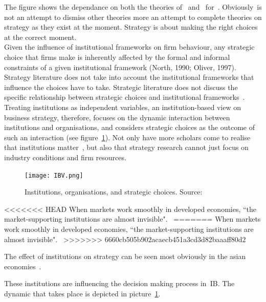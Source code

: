 The figure shows the dependance on both the theories of~\cite{Barney:2001} and~\cite{Porter:1980} for~\ibv. Obviously~\ibv is not an attempt to dismiss other theories more an attempt to complete theories on strategy as they exist at the moment. Strategy is about making the right choices at the correct moment. \\
Given the influence of institutional frameworks on firm behaviour, any strategic choice that firms make is inherently affected by the formal and informal constraints of a given institutional framework (North, 1990; Oliver, 1997). 
Strategy literature does not take into account the institutional frameworks that influence the choices \mne have to take. 
Strategic literature does not discuss the specific relationship between strategic choices and institutional frameworks~\cite{Peng:2008}.
Treating institutions as independent variables, an institution-based view on business strategy, therefore, focuses on the dynamic interaction between institutions and organisations, and considers strategic choices as the outcome of such an interaction (see figure~\ref{fig:ibv})\cite{Peng:2002}.
Not only have more scholars come to realise that institutions matter~\cite{Powell:1991,Scott:1995}, but also that strategy research cannot just focus on industry conditions and firm resources.~\cite{Khanna:1997}\\


%


\begin{figure}[htbp!]
	\centering
	\texttt{[image: IBV.png]}
 	\caption{Institutions, organisations, and strategic choices. Source:~\cite{Peng:2000}}
 	\label{fig:ibv}
\end{figure}



<<<<<<< HEAD
When markets work smoothly in developed economies, ``the market-supporting institutions are almost invisible".~\cite{mcMillan:2007}
=======
When markets work smoothly in developed economies, ``the market-supporting institutions are almost invisible".~\cite{McMillan:2007}
>>>>>>> 6660cb505b902acaecb451a3cd3d82baaaff80d2


The effect of institutions on strategy can be seen most obviously in the asian economies~\cite{Peng:2002}.











These institutions are influencing the decision making process in~\gls{IB}.  The dynamic that takes place is depicted in picture~\ref{fig:ibv}. 


